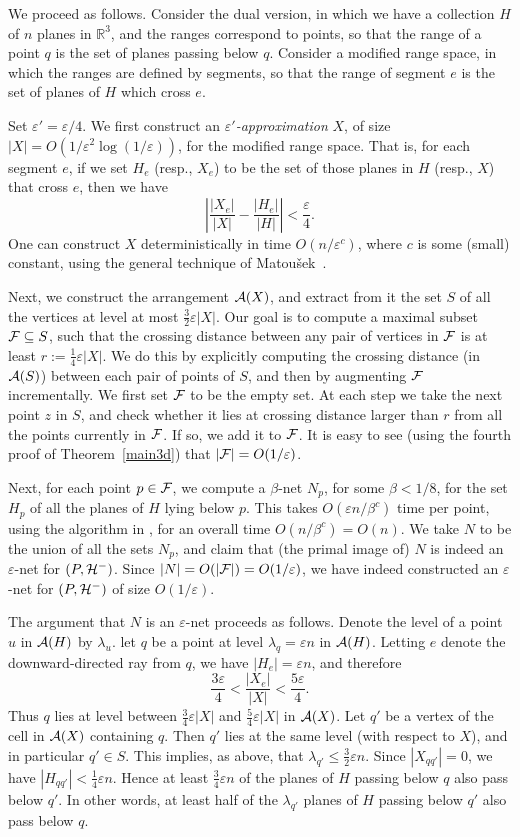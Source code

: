 \documentclass[12pt]{article}
\newcommand{\eps}{{\varepsilon}}
\newcommand{\reals}{{\mathbb R}}
\providecommand{\Matousek}{Matou{\v s}ek\xspace}
\def\A{{\cal A}}
\def\F{{\cal F}}
\newcommand{\CalH}{{\cal H}}
\begin{document}
We proceed as follows. Consider the dual version, in which we have a
collection $H$ of $n$ planes in $\reals^3$, and the ranges correspond
to points, so that the range of a point $q$ is the set of planes
passing below $q$. Consider a modified range space, in which the
ranges are defined by segments, so that the range of segment $e$ is
the set of planes of $H$ which cross $e$.

Set $\eps'=\eps/4$. We first construct an \emph{$\eps'$-approximation}
$X$, of size $|X| =O(1/\eps^2 \log(1/\eps))$, for the modified range
space.  That is, for each segment $e$, if we set $H_e$ (resp., $X_e$)
to be the set of those planes in $H$ (resp., $X$) that cross $e$, then
we have
$$
\left| \frac{|X_e|}{|X|} - \frac{|H_e|}{|H|} \right| <
\frac{\eps}{4}.
$$
One can construct $X$ deterministically in time $O(n/\eps^c)$, where
$c$ is some (small) constant, using the general technique of
\Matousek~\cite{m-dcg-96}.

Next, we construct the arrangement $\A(X)$, and extract from it
the set $S$ of all the vertices at level at most $\frac32\eps |X|$.
Our goal is to compute a maximal subset $\F\subseteq S$, such
that the crossing distance between any pair of vertices in $\F$
is at least $r := \frac14 \eps |X|$.
We do this by explicitly computing the crossing distance
(in $\A(S)$) between each pair of points of $S$, and then by
augmenting $\F$ incrementally. We first set $\F$ to be the empty set.
At each step we take the next point $z$ in $S$, and check whether it
lies at crossing distance larger than $r$ from all the points
currently in $\F$. If so, we add it to $\F$. It is easy to see
(using the fourth proof of Theorem~\ref{main3d}) that
$|\F| =O(1/\eps)$.

Next, for each point $p \in \F$, we compute a $\beta$-net $N_p$, for
some $\beta < 1/8$, for the set $H_p$ of all the planes of $H$ lying
below $p$. This takes $O(\eps n/\beta^c)$ time per point, using the
algorithm in \cite{m-dcg-96}, for an overall time $O(n/\beta^c)=O(n)$.
We take $N$ to be the union of all the sets $N_p$, and claim that (the
primal image of) $N$ is indeed an $\eps$-net for $(P,\CalH^-)$. Since
$|N| = O(|\F|) = O(1/\eps)$, we have indeed constructed an $\eps$-net
for $(P,\CalH^-)$ of size $O(1/\eps)$.

The argument that $N$ is an $\eps$-net proceeds as follows.
Denote the level of a point $u$ in $\A(H)$ by $\lambda_u$.
let $q$ be a point at level $\lambda_q=\eps n$ in $\A(H)$.
Letting $e$ denote the downward-directed ray from $q$, we have
$|H_e|=\eps n$, and therefore
$$
\frac{3\eps}{4} < \frac{|X_e|}{|X|} < \frac{5\eps}{4} .
$$
Thus $q$ lies at level between $\frac34\eps|X|$ and $\frac54\eps|X|$
in $\A(X)$. Let $q'$ be a vertex of the cell in $\A(X)$ containing
$q$. Then $q'$ lies at the same level (with respect to $X$), and in particular $q'\in S$.
This implies, as above, that $\lambda_{q'} \le \frac32\eps n$.
Since $|X_{qq'}|=0$, we have $|H_{qq'}| < \frac14\eps n$. Hence at
least $\frac34\eps n$ of the planes of $H$ passing below $q$ also pass
below $q'$. In other words, at least half of the $\lambda_{q'}$ planes
of $H$ passing below $q'$ also pass below $q$.
\end{document}
